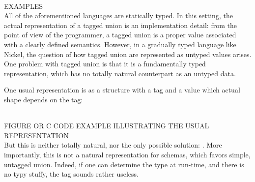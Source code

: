 \documentclass{article}
\begin{document}
\\
EXAMPLES
\\

All of the aforementioned languages are statically typed. In this setting, the
actual representation of a tagged union is an implementation detail: from the
point of view of the programmer, a tagged union is a proper value 
associated with a clearly defined semantics. However, in a gradually typed language like Nickel,
the question of how tagged union are represented as untyped values arises. One
problem with tagged union is that it is a fundamentally typed representation,
which has no totally natural counterpart as an untyped data.

One usual representation is as a structure with a tag and a value which actual
shape depends on the tag:

\\
FIGURE OR C CODE EXAMPLE ILLUSTRATING THE USUAL REPRESENTATION
\\

But this is neither totally natural, nor the only possible solution: 
. More importantly, this is not a natural representation for schemas, which
favors simple, untagged union. Indeed, if one can determine the type at
run-time, and there is no typy stuffy, the tag sounds rather useless.
\end{document}
